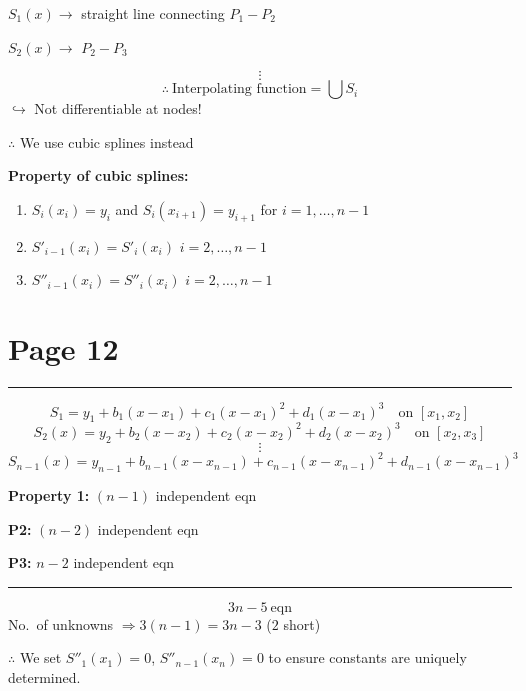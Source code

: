 \documentclass[11pt,a4paper]{article}
\newcommand{\pagehead}[1]{%
  \clearpage
  \section*{Page #1}
  \vspace{-0.6em}
  {\color{black!45}\rule{\linewidth}{0.5pt}}
  \vspace{0.4em}
}
\begin{document}
$S_1(x)\to$ straight line connecting $P_1-P_2$

$S_2(x)\to$ \phantom{straight line connecting} $P_2-P_3$

\[
\vdots
\]
\[
\therefore\ \text{Interpolating function}=\bigcup S_i
\]
$\hookrightarrow$ Not differentiable at nodes!

$\therefore$ We use cubic splines instead

\begin{center}
\end{center}

\textbf{Property of cubic splines:}
\begin{enumerate}[label=(\arabic*),leftmargin=2.6em]
\item $S_i(x_i)=y_i$ \quad and \quad $S_i(x_{i+1})=y_{i+1}$
      \quad for $i=1,\dots,n-1$
\item $S'_{i-1}(x_i)=S'_i(x_i)$ \quad $i=2,\dots,n-1$
\item $S''_{i-1}(x_i)=S''_i(x_i)$ \quad $i=2,\dots,n-1$
\end{enumerate}

\pagehead{12}

\[
S_1=y_1+b_1(x-x_1)+c_1(x-x_1)^2+d_1(x-x_1)^3
\quad\text{on }[x_1,x_2]
\]
\[
S_2(x)=y_2+b_2(x-x_2)+c_2(x-x_2)^2+d_2(x-x_2)^3
\quad\text{on }[x_2,x_3]
\]
\[
\vdots
\]
\[
S_{n-1}(x)=y_{n-1}+b_{n-1}(x-x_{n-1})+c_{n-1}(x-x_{n-1})^2
+d_{n-1}(x-x_{n-1})^3
\]

\textbf{Property 1:} $(n-1)$ independent eqn

\textbf{P2:} $(n-2)$ independent eqn

\textbf{P3:} $n-2$ independent eqn

\vspace{-0.2em}
{\color{black!45}\rule{6cm}{0.4pt}}

\[
3n-5\ \text{eqn}
\]
No.\ of unknowns $\Rightarrow 3(n-1)=3n-3$ \quad ($2$ short)

$\therefore$ We set $S''_1(x_1)=0$, $S''_{n-1}(x_n)=0$ to ensure constants are
uniquely determined.
\end{document}
